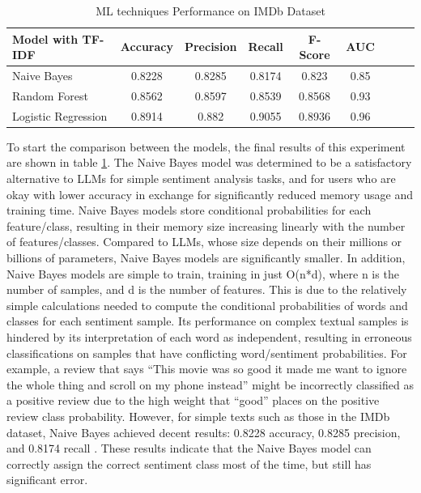 \documentclass[10pt,twocolumn,letterpaper]{article}
\begin{document}
\begin{table}
\begin{center}

\begin{tabular}{|l|c|c|c|c|c|c|c|c|}
\hline
Model with TF-IDF & Accuracy & Precision & Recall & F-Score & AUC \\
\hline\hline
Naive Bayes   & 0.8228 & 0.8285 & 0.8174 & 0.823 & 0.85   \\

Random Forest   & 0.8562 & 0.8597 & 0.8539 & 0.8568 & 0.93  \\

Logistic Regression  & 0.8914 & 0.882 & 0.9055 & 0.8936 & 0.96     \\

\hline
\end{tabular}
\end{center}
\caption{ML techniques Performance on IMDb Dataset}
\label{tab:large-models-metrics}
\end{table}

To start the comparison between the models, the final results of this experiment are shown in table \ref{tab:large-models-metrics}. The Naive Bayes model was determined to be a satisfactory alternative to LLMs for simple sentiment analysis tasks, and for users who are okay with lower accuracy in exchange for significantly reduced memory usage and training time. Naive Bayes models store conditional probabilities for each feature/class, resulting in their memory size increasing linearly with the number of features/classes. Compared to LLMs, whose size depends on their millions or billions of parameters, Naive Bayes models are significantly smaller. In addition, Naive Bayes models are simple to train, training in just O(n*d), where n is the number of samples, and d is the number of features. This is due to the relatively simple calculations needed to compute the conditional probabilities of words and classes for each sentiment sample. Its performance on complex textual samples is hindered by its interpretation of each word as independent, resulting in erroneous classifications on samples that have conflicting word/sentiment probabilities. For example, a review that says “This movie was so good it made me want to ignore the whole thing and scroll on my phone instead” might be incorrectly classified as a positive review due to the high weight that “good” places on the positive review class probability. However, for simple texts such as those in the IMDb dataset, Naive Bayes achieved decent results: 0.8228 accuracy, 0.8285 precision, and 0.8174  recall \cite{MLTechniques}. These results indicate that the Naive Bayes model can correctly assign the correct sentiment class most of the time, but still has significant error. 
\end{document}

